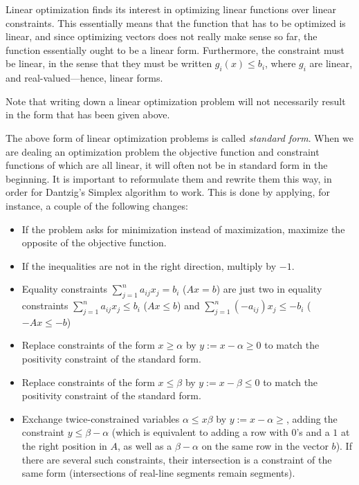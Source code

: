 \begin{remark}
    Linear optimization finds its interest in optimizing linear functions over linear constraints. This essentially means that the function that has to be optimized is linear, and since optimizing vectors does not really make sense so far, the function essentially ought to be a linear form. Furthermore, the constraint must be linear, in the sense that they must be written $ g_i(x) \leqslant b_i $, where $ g_i $ are linear, and real-valued---hence, linear forms.

    Note that writing down a linear optimization problem will not necessarily result in the form that has been given above.

    The above form of linear optimization problems is called \textit{standard form}. When we are dealing an optimization problem the objective function and constraint functions of which are all linear, it will often not be in standard form in the beginning. It is important to reformulate them and rewrite them this way, in order for Dantzig's Simplex algorithm to work. This is done by applying, for instance, a couple of the following changes:

    \begin{itemize}
        \item If the problem asks for minimization instead of maximization, maximize the opposite of the objective function.
        
        \item If the inequalities are not in the right direction, multiply by $ -1 $. 

        \item Equality constraints $ \sum_{j=1}^n a_{ij}x_j = b_i $ ($ Ax = b $) are just two in equality constraints $ \sum_{j=1}^n a_{ij}x_j \leqslant b_i $ ($ Ax \leqslant b $) and $ \sum_{j=1}^n (-a_{ij})x_j \leqslant -b_i $ ($ -Ax \leqslant -b $)

        \item Replace constraints of the form $ x \geqslant \alpha $ by $ y := x - \alpha \geqslant 0$ to match the positivity constraint of the standard form.

        \item Replace constraints of the form $ x \leqslant \beta $ by $ y := x - \beta \leqslant 0$ to match the positivity constraint of the standard form.

        \item Exchange twice-constrained variables $ \alpha \leqslant x \beta $ by $ y := x - \alpha \geqslant $, adding the constraint $ y \leqslant \beta - \alpha $ (which is equivalent to adding a row with $ 0 $'s and a $ 1 $ at the right position in $ A $, as well as a $ \beta - \alpha $ on the same row in the vector $ b $). If there are several such constraints, their intersection is a constraint of the same form (intersections of real-line segments remain segments).


\end{itemize}
\end{remark}
